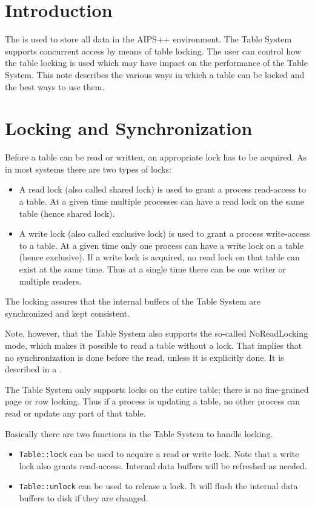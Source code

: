\section{Introduction}
The 
is used to store all data in the AIPS++ environment.
The Table System supports concurrent access by means of table locking.
The user can control how the table locking is used which may have
impact on the performance of the Table System.
This note describes the various ways in which a table can be locked
and the best ways to use them.

\section{Locking and Synchronization}
Before a table can be read or written, an appropriate lock has to be
acquired. As in most systems there are two types of locks:
\begin{itemize}
\item A read lock (also called shared lock) is used to grant a process
read-access to a table. At a given time multiple processes can have
a read lock on the same table (hence shared lock).
\item A write lock (also called exclusive lock) is used to grant a
process write-access to a table. At a given time only one process can
have a write lock on a table (hence exclusive). If a write lock
is acquired, no read lock on that table can exist at the same time.
Thus at a single time there can be one writer or multiple readers.
\end{itemize}
The locking assures that the internal buffers of the Table
System are synchronized and kept consistent.

Note, however, that the Table System also supports the so-called
NoReadLocking mode, which makes it possible to read a table without a
lock. That implies that no synchronization is done before the read,
unless it is explicitly done. It is described in a
.

The Table System only supports locks on the entire table; there is
no fine-grained page or row locking. Thus if a process is updating a
table, no other process can read or update any part of that table.

\medskip
Basically there are two functions in the Table System to handle
locking.
\begin{itemize}
\item \texttt{Table::lock} can be used to acquire a read or write
lock. Note that a write lock also grants read-access.
Internal data buffers will be refreshed as needed.
\item \texttt{Table::unlock} can be used to release a lock.
It will flush the internal data buffers to disk if they are changed.
\end{itemize}

